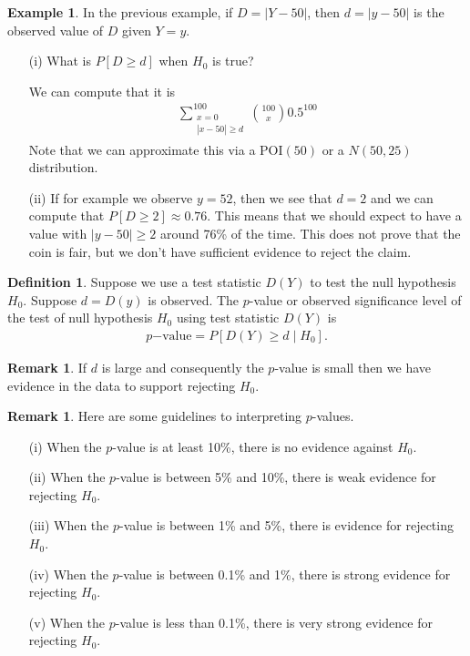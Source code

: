 \documentclass[11pt]{amsart}
\theoremstyle{definition}
\newtheorem{definition}[theorem]{Definition}
\newtheorem{remark}[theorem]{Remark}
\newtheorem{example}[theorem]{Example}
\numberwithin{equation}{section}
\begin{document}
\begin{example}
    In the previous example, if $D=|Y-50|$, then $d=|y-50|$ is the observed value of $D$ given $Y=y$.
    \begin{enumerate}
        \item [(i)] What is $P[D\ge d]$ when $H_0$ is true?

        We can compute that it is
        \begin{align*}
            \sum_{\substack{x=0\\|x-50|\ge d}}^{100}\binom{100}{x}0.5^{100}
        \end{align*}
        Note that we can approximate this via a $\mathrm{POI}(50)$ or a $N(50,25)$ distribution.
        \item [(ii)] If for example we observe $y=52$, then we see that $d=2$ and we can compute that $P[D\ge 2]\approx0.76$. This means that we should expect to have a value with $|y-50|\ge 2$ around 76\% of the time. This does not prove that the coin is fair, but we don't have sufficient evidence to reject the claim.
    \end{enumerate}
\end{example}
\begin{definition}
    Suppose we use a test statistic $D(Y)$ to test the null hypothesis $H_0$. Suppose $d=D(y)$ is observed. The $p$-value or observed significance level of the test of null hypothesis $H_0$ using test statistic $D(Y)$ is
    \begin{align*}
        p\mathrm{-value}=P[D(Y)\ge d\mid H_0].
    \end{align*}
\end{definition}
\begin{remark}
    If $d$ is large and consequently the $p$-value is small then we have evidence in the data to support rejecting $H_0$.
\end{remark}
\begin{remark}
    Here are some guidelines to interpreting $p$-values.
    \begin{enumerate}
        \item [(i)] When the $p$-value is at least 10\%, there is no evidence against $H_0$.
        \item [(ii)] When the $p$-value is between 5\% and 10\%, there is weak evidence for rejecting $H_0$.
        \item [(iii)] When the $p$-value is between 1\% and 5\%, there is evidence for rejecting $H_0$.
        \item [(iv)] When the $p$-value is between 0.1\% and 1\%, there is strong evidence for rejecting $H_0$.
        \item [(v)] When the $p$-value is less than 0.1\%, there is very strong evidence for rejecting $H_0$.
    \end{enumerate}
\end{remark}
\end{document}
